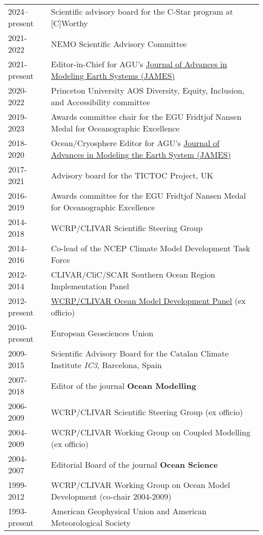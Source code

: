 \documentclass{article}
\begin{document}
\begin{tabular}{ll}
    2024--present & Scientific advisory board for the C-Star program at [C]Worthy
  \\
2021-2022 & NEMO Scientific Advisory Committee
\\
2021-present & Editor-in-Chief for  AGU's  \href{http://agupubs.onlinelibrary.wiley.com/hub/journal/10.1002/(ISSN)1942-2466/editorial-board/editorial-board.html}{Journal of Advances in Modeling Earth Systems (JAMES)} 
 \\
 2020-2022 & Princeton University AOS Diversity, Equity, Inclusion, and Accessibility committee
 \\
2019-2023 & Awards committee chair for the EGU Fridtjof Nansen Medal for Oceanographic Excellence 
\\
2018-2020 & Ocean/Cryosphere Editor for AGU's  \href{http://agupubs.onlinelibrary.wiley.com/hub/journal/10.1002/(ISSN)1942-2466/editorial-board/editorial-board.html}{Journal of Advances in Modeling the Earth System (JAMES)} 
\\
2017-2021 & Advisory board for the TICTOC Project, UK
\\
  2016-2019 & Awards committee for the EGU Fridtjof Nansen Medal for Oceanographic Excellence 
  \\
2014-2018 &  WCRP/CLIVAR Scientific Steering Group 
\\
2014-2016     & Co-lead of the NCEP Climate Model Development Task Force
\\
2012-2014     & CLIVAR/CliC/SCAR Southern Ocean Region Implementation Panel 
\\
2012-present &  \href{http://www.clivar.org/clivar-panels/omdp}{WCRP/CLIVAR Ocean Model Development Panel} (ex officio)
\\
2010-present & European Geosciences Union 
\\
2009-2015     &  Scientific Advisory Board for the Catalan  Climate Institute {\it IC3}, Barcelona, Spain 
\\
2007-2018 & Editor of the journal {\bf Ocean Modelling} 
\\
2006-2009     &  WCRP/CLIVAR Scientific Steering Group (ex officio) 
\\
2004-2009     &  WCRP/CLIVAR Working Group on Coupled Modelling (ex officio) \\
2004-2007     & Editorial Board of the journal {\bf Ocean Science} \\
1999-2012     & WCRP/CLIVAR Working Group on Ocean Model Development  (co-chair 2004-2009) \\
1993-present  & American Geophysical Union and American Meteorological Society \\
\end{tabular}
\end{document}
